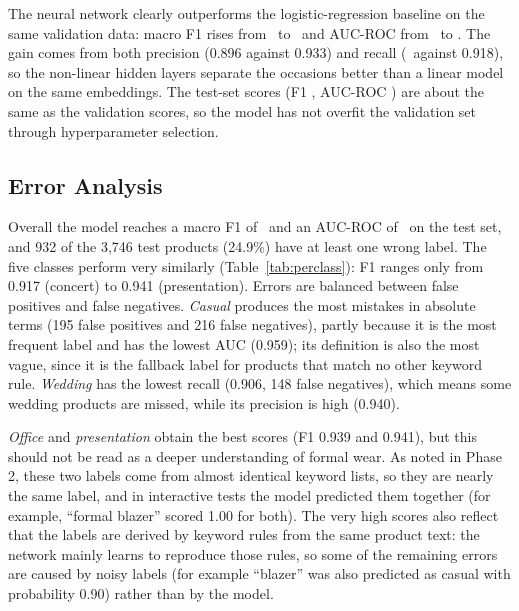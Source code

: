 The neural network clearly outperforms the logistic-regression baseline on the same validation data: macro F1 rises from \baseF\ to \bestValF\ and AUC-ROC from \baseA\ to \bestValAUC. The gain comes from both precision (0.896 against 0.933) and recall (\baseR\ against 0.918), so the non-linear hidden layers separate the occasions better than a linear model on the same embeddings. The test-set scores (F1 \testFone, AUC-ROC \testAUC) are about the same as the validation scores, so the model has not overfit the validation set through hyperparameter selection.

\begin{table}[htbp]
\centering
{}
\caption{Per-class test results (FP/FN = false positives / false negatives).}
\label{tab:perclass}
\end{table}


\subsection{Error Analysis}

Overall the model reaches a macro F1 of \testFone\ and an AUC-ROC of \testAUC\ on the test set, and 932 of the 3,746 test products (24.9\%) have at least one wrong label. The five classes perform very similarly (Table~\ref{tab:perclass}): F1 ranges only from 0.917 (concert) to 0.941 (presentation). Errors are balanced between false positives and false negatives. \emph{Casual} produces the most mistakes in absolute terms (195 false positives and 216 false negatives), partly because it is the most frequent label and has the lowest AUC (0.959); its definition is also the most vague, since it is the fallback label for products that match no other keyword rule. \emph{Wedding} has the lowest recall (0.906, 148 false negatives), which means some wedding products are missed, while its precision is high (0.940).

\emph{Office} and \emph{presentation} obtain the best scores (F1 0.939 and 0.941), but this should not be read as a deeper understanding of formal wear. As noted in Phase 2, these two labels come from almost identical keyword lists, so they are nearly the same label, and in interactive tests the model predicted them together (for example, ``formal blazer'' scored 1.00 for both). The very high scores also reflect that the labels are derived by keyword rules from the same product text: the network mainly learns to reproduce those rules, so some of the remaining errors are caused by noisy labels (for example ``blazer'' was also predicted as casual with probability 0.90) rather than by the model.

